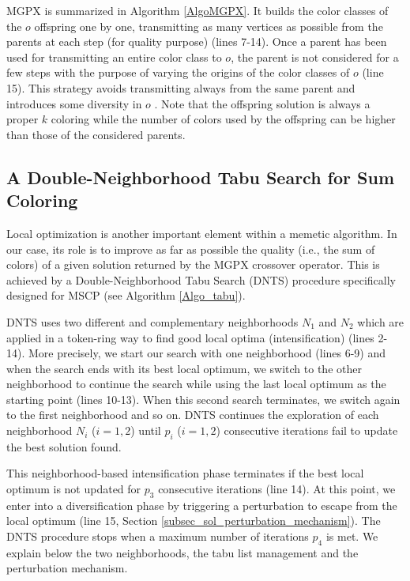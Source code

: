 \documentclass{elsart}
\begin{document}
MGPX is summarized in Algorithm \ref{AlgoMGPX}. It builds the color classes of the $o$ offspring one by one, transmitting as many vertices as possible from the parents at each step (for quality purpose) (lines 7-14). Once a parent has been used for transmitting an entire color class to $o$, the parent is not considered for a few steps with the purpose of varying the origins of the color classes of $o$ (line 15). This strategy avoids transmitting always from the same parent and introduces some diversity in $o$ \cite{Lu&Hao2010}. Note that the offspring solution is always a proper $k$ coloring while the number of colors used by the offspring can be higher than those of the considered parents.







\subsection{A Double-Neighborhood Tabu Search for Sum Coloring}
\label{subsec_sol_TS}


Local optimization is another important element within a memetic algorithm. In our case, its role is to improve as far as possible the quality (i.e., the sum of colors) of a given solution returned by the MGPX crossover operator. This is achieved by a Double-Neighborhood Tabu Search (DNTS) procedure specifically designed for MSCP (see Algorithm \ref{Algo_tabu}). 

DNTS uses two different and complementary neighborhoods $N_1$ and $N_2$ which are applied in a token-ring way \cite{GasperoSchaerf2006,Luetal2011} to find good local optima (intensification) (lines 2-14). More precisely, we start our search with one neighborhood (lines 6-9) and when the search ends with its best local optimum, we switch to the other neighborhood to continue the search while using the last local optimum as the starting point (lines 10-13). When this second search terminates, we switch again to the first neighborhood and so on. DNTS continues the exploration of each neighborhood $N_i$ ($i=1,2$) until $p_i$ ($i=1,2$) consecutive iterations fail to update the best solution found. 

This neighborhood-based intensification phase terminates if the best local optimum is not updated for $p_3$ consecutive iterations (line 14). At this point, we enter into a diversification phase by triggering a perturbation to escape from the local optimum (line 15, Section \ref{subsec_sol_perturbation_mechanism}). The DNTS procedure stops when a maximum number of iterations $p_4$ is met. We explain below the two neighborhoods, the tabu list management and the perturbation mechanism. 
\end{document}
